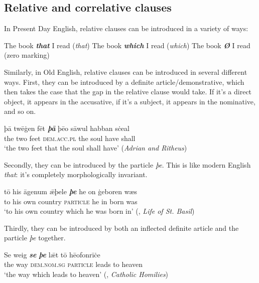 \subsection{Relative and correlative clauses}\label{OE-relative}

In Present Day English, relative clauses can be introduced in a variety of ways:

\begin{exe}
    \ex The book \emph{\textbf{that}} I read \hfill (\emph{that})
    \ex The book \emph{\textbf{which}} I read \hfill (\emph{which})
    \ex The book \emph{\textbf{Ø}} I read \hfill (zero marking)
\end{exe}

\noindent Similarly, in Old English, relative clauses can be introduced in several different ways. First, they can be introduced by a definite article/demonstrative, which then takes the case that the gap in the relative clause would take. If it's a direct object, it appears in the accusative, if it's a subject, it appears in the nominative, and so on.

\begin{exe}
    \ex
    \gll þā twēġen fēt \emph{\textbf{þā}} þēo sāwul habban sċeal\\
    the two feet \textsc{dem.acc.pl} the soul have shall\\
    \trans `the two feet that the soul shall have' \hfill (\emph{Adrian and Ritheus})
\end{exe}

\noindent Secondly, they can be introduced by the particle \emph{þe}. This is like modern English \emph{that}: it's completely morphologically invariant.

\begin{exe}
    \ex
    \gll tō his āgenum ǣþele \emph{\textbf{þe}} he on ġeboren wæs\\
    to his own country \textsc{particle} he in born was\\
    \trans `to his own country which he was born in' \hfill (, \emph{Life of St. Basil})
\end{exe}

\noindent Thirdly, they can be introduced by both an inflected definite article and the particle \emph{þe} together.

\begin{exe}
    \ex
    \gll Se weig \emph{\textbf{se}} \emph{\textbf{þe}} lǣt tō hēofonrīċe\\
    the way \textsc{dem.nom.sg} \textsc{particle} leads to heaven\\
    \trans `the way which leads to heaven' \hfill (, \emph{Catholic Homilies})
\end{exe}

